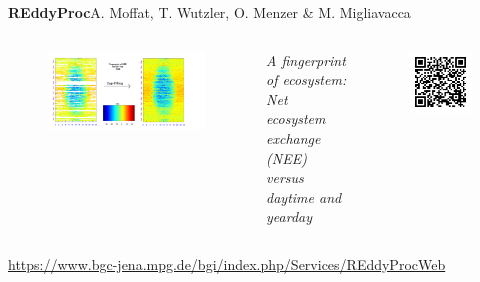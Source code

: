 \begin{columns}
\begin{column}{.48\textwidth}
\begin{center}
\begin{minipage}[T]{.95\textwidth}
{\begin{block}{\vspace{.2cm}\textbf{REddyProc}\hfill\normalsize{A. Moffat, T. Wutzler, O. Menzer \& M. Migliavacca}}
\begin{columns}
    \begin{figure}[tb]
    \begin{center}
        \includegraphics[width=.95\textwidth]{images/content/DE-Tha_1998_FP_NEE_ffc}
    \end{center}
    \end{figure}
\small{\textit{A fingerprint of ecosystem: Net ecosystem exchange (NEE) versus daytime and yearday}}
\vspace{4cm}
	\begin{figure}[tb]
		\includegraphics[width=.6\textwidth]{images/qrcodeREddyProc.jpg}
	\end{figure}
\end{columns}
\vspace{1cm}
\hfill\large{\url{https://www.bgc-jena.mpg.de/bgi/index.php/Services/REddyProcWeb}}
\end{block}
\vspace{3ex}

}
\end{minipage}
\end{center}
\end{column}
\end{columns}
